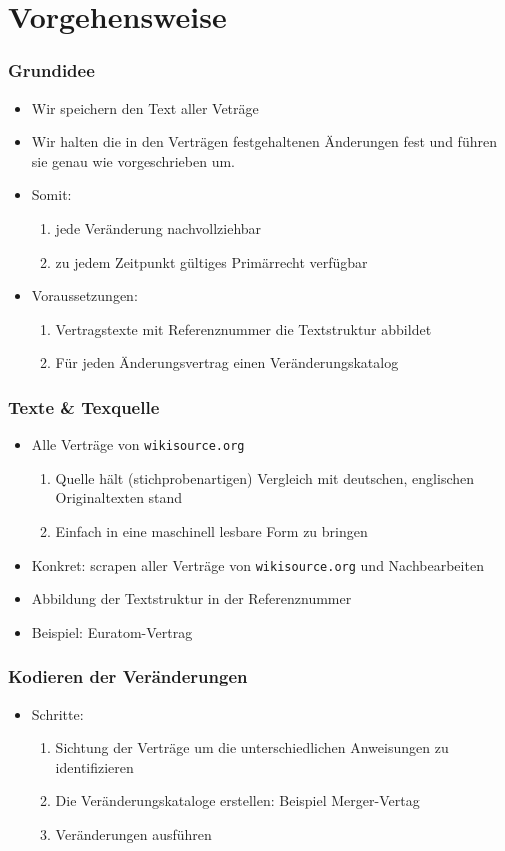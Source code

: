 \documentclass[xcolor=dvipsnames]{beamer} %
\begin{document}
\section{Vorgehensweise}
\begin{frame}
  \frametitle{Grundidee}
  \begin{itemize}
  \item Wir speichern den Text aller Veträge
  \item Wir halten die in den Verträgen festgehaltenen Änderungen fest und
   führen sie genau wie vorgeschrieben um. 
 \item Somit:
   \begin{enumerate}
   \item jede Veränderung nachvollziehbar
   \item zu jedem Zeitpunkt gültiges Primärrecht verfügbar
   \end{enumerate}
 \item Voraussetzungen:
   \begin{enumerate}
   \item Vertragstexte mit Referenznummer die Textstruktur abbildet
   \item Für jeden Änderungsvertrag einen Veränderungskatalog
   \end{enumerate}
  \end{itemize}
\end{frame}

\begin{frame}
  \frametitle{Texte \& Texquelle}
  \begin{itemize}
  \item Alle Verträge von \texttt{wikisource.org} 
    \begin{enumerate}
    \item Quelle hält (stichprobenartigen) Vergleich mit deutschen, englischen
      Originaltexten stand
    \item Einfach in eine maschinell lesbare Form zu bringen
    \end{enumerate}
  \item Konkret: scrapen aller Verträge von \texttt{wikisource.org} und
    Nachbearbeiten
  \item Abbildung der Textstruktur in der Referenznummer
  \item Beispiel: Euratom-Vertrag
  \end{itemize}
\end{frame}

\begin{frame}
  \frametitle{Kodieren der Veränderungen}
  \begin{itemize}
  \item Schritte:
    \begin{enumerate}
    \item Sichtung der Verträge um die unterschiedlichen Anweisungen zu
      identifizieren
    \item Die Veränderungskataloge erstellen: Beispiel Merger-Vertag
    \item Veränderungen ausführen
    \end{enumerate}
  \end{itemize}
\end{frame}
\end{document}
